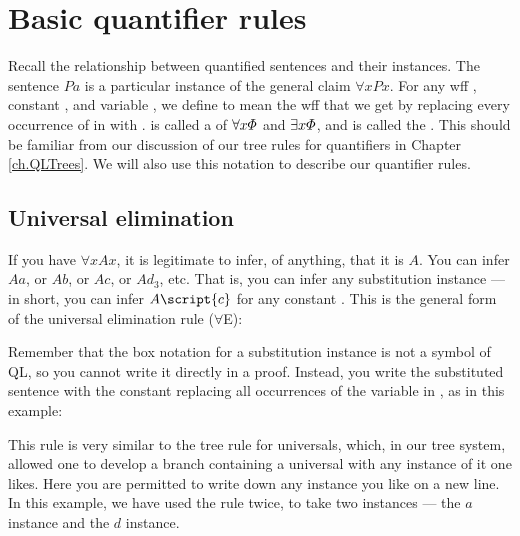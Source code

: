 \section{Basic quantifier rules}

Recall the relationship between quantified sentences and their instances. The sentence $Pa$ is a particular instance of the general claim $\forall x Px$. For any wff \metaA{}, constant , and variable , we define \metaA{} to mean the wff that we get by replacing every occurrence of  in \metaA{} with . \metaA{} is called a  of $\forall x\varPhi{}$ and $\exists x\varPhi{}$, and  is called the . This should be familiar from our discussion of our tree rules for quantifiers in Chapter \ref{ch.QLTrees}. We will also use this notation to describe our quantifier rules.



\subsection{Universal elimination}

If you have $\forall x Ax$, it is legitimate to infer, of anything, that it is $A$. You can infer $Aa$, or $Ab$, or $Ac$, or $Ad_3$, etc. That is, you can infer any substitution instance --- in short, you can infer $A\script{c}$ for any constant . This is the general form of the universal elimination rule ($\forall$E):

\begin{ndproof}
	 
\end{ndproof}


Remember that the box notation for a substitution instance is not a symbol of QL, so you cannot write it directly in a proof. Instead, you write the substituted sentence with the constant  replacing all occurrences of the variable  in \metaA{}, as in this example:

\begin{ndproof}
	 
	 
\end{ndproof}

This rule is very similar to the tree rule for universals, which, in our tree system, allowed one to develop a branch containing a universal with any instance of it one likes. Here you are permitted to write down any instance you like on a new line. In this example, we have used the rule twice, to take two instances --- the $a$ instance and the $d$ instance.

